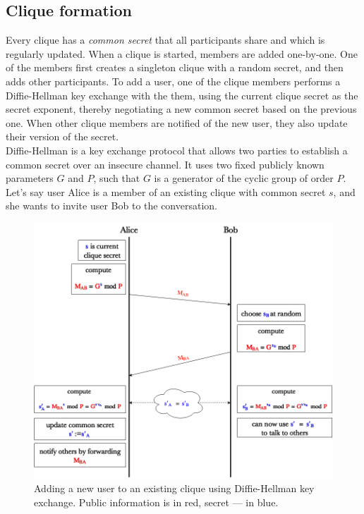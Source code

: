 \documentclass[a4paper, 12pt]{report}
\begin{document}
\subsection{Clique formation}
\label{subsec:prep.formation}
Every clique has a \emph{common secret} that all participants share and which is regularly updated. When a clique is started, members are added one-by-one. One of the members first creates a singleton clique with a random secret, and then adds other participants. To add a user, one of the clique members performs a Diffie-Hellman key exchange \cite{diffie1976new} with the them, using the current clique secret as the secret exponent, thereby negotiating a new common secret based on the previous one. When other clique members are notified of the new user, they also update their version of the secret. \\

Diffie-Hellman is a key exchange protocol that allows two parties to establish a common secret over an insecure channel. It uses two fixed publicly known parameters $G$ and $P$, such that $G$ is a generator of the cyclic group of order $P$. Let's say user Alice is a member of an existing clique with common secret $s$, and she wants to invite user Bob to the conversation. 
\begin{figure}[h]
    \captionsetup{width=0.8\textwidth}
    \centering
    \includegraphics[width = 0.85 \linewidth]{pics/DH.png}
    \caption{Adding a new user to an existing clique using Diffie-Hellman key exchange. Public information is in {\color{red}red}, secret --- in {\color{blue}blue}.}
    \label{fig:DH}
\end{figure}
\end{document}
